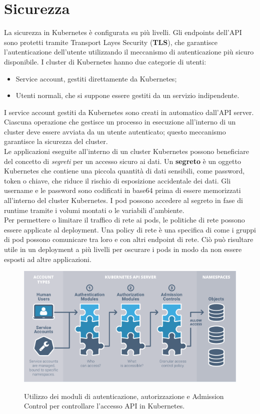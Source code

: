 \documentclass[12pt, a4paper]{report}
\begin{document}
\section{Sicurezza}
La sicurezza in Kubernetes è configurata su più livelli. Gli endpoints dell'API sono protetti tramite Transport Layes Security (\textbf{TLS}), che garantisce l'autenticazione dell'utente utilizzando il meccanismo di autenticazione più sicuro disponibile. I cluster di Kubernetes hanno due categorie di utenti:
\begin{itemize}
  \item Service account, gestiti direttamente da Kubernetes;
  \item Utenti normali, che si suppone essere gestiti da un servizio indipendente.
\end{itemize}
I service account gestiti da Kubernetes sono creati in automatico dall'API server. Ciascuna operazione che gestisce un processo in esecuzione all'interno di un cluster deve essere avviata da un utente autenticato; questo meccanismo garantisce la sicurezza del cluster.\\
Le applicazioni eseguite all'interno di un cluster Kubernetes possono beneficiare del concetto di \textit{segreti} per un accesso sicuro ai dati. Un \textbf{segreto} è un oggetto Kubernetes che contiene una piccola quantità di dati sensibili, come password, token o chiave, che riduce il rischio di esposizione accidentale dei dati. Gli username e le password sono codificati in base64 prima di essere memorizzati all'interno del cluster Kubernetes. I pod possono accedere al segreto in fase di runtime tramite i volumi montati o le variabili d'ambiente.\\
Per permettere o limitare il traffico di rete ai pods, le politiche di rete possono essere applicate al deployment. Una policy di rete è una specifica di come i gruppi di pod possono comunicare tra loro e con altri endpoint di rete. Ciò può risultare utile in un deployment a più livelli per oscurare i pods in modo da non essere esposti ad altre applicazioni.
\begin{figure}
  \begin{center}
\includegraphics[scale = 0.5]{Images/Kubernetes-auth}\\
  \caption{Utilizzo dei moduli di autenticazione, autorizzazione e Admission Control per controllare l'accesso API in Kubernetes.}
  \end{center}
\end{figure}
\newpage
\end{document}
